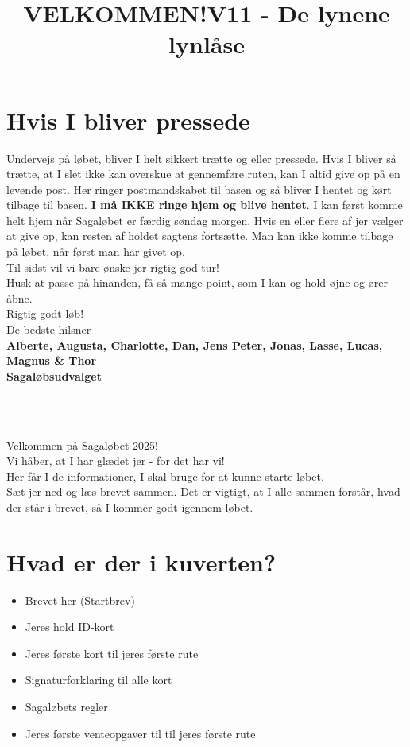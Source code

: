 \section{Hvis I bliver pressede}
Undervejs på løbet, bliver I helt sikkert trætte og eller pressede. Hvis I bliver så trætte, at I slet ikke kan overskue at gennemføre ruten, kan I altid give op på en levende post. Her ringer postmandskabet til basen og så bliver I hentet og kørt tilbage til basen. \textbf{I må IKKE ringe hjem og blive hentet}. I kan først komme helt hjem når Sagaløbet er færdig søndag morgen. Hvis en eller flere af jer vælger at give op, kan resten af holdet sagtens fortsætte. Man kan ikke komme tilbage på løbet, når først man har givet op.\\
\newline
Til sidst vil vi bare ønske jer rigtig god tur!\\
Husk at passe på hinanden, få så mange point, som I kan og hold øjne og ører åbne.\\
\newline
Rigtig godt løb!\\
\newline
\textcolor{søblå}{De bedste hilsner}\\
\textcolor{natblå}{\textbf{Alberte, Augusta, Charlotte, Dan, Jens Peter, Jonas, Lasse, Lucas, Magnus \& Thor}}\\
\textcolor{natblå}{\textbf{Sagaløbsudvalget}}\\
\newpage
\title{VELKOMMEN!}\\
\newline
\title{\textcolor{søblå}{V11 - De lynene lynlåse }}\\
\newline
Velkommen på Sagaløbet 2025!\\
Vi håber, at I har glædet jer - for det har vi!\\
Her får I de informationer, I skal bruge for at kunne starte løbet.\\
Sæt jer ned og læs brevet sammen. Det er vigtigt, at I alle sammen forstår, hvad der står i brevet, så I kommer godt igennem løbet.
\section{Hvad er der i kuverten?}
\begin{itemize}
    \item Brevet her (Startbrev)
    \item Jeres hold ID-kort
    \item Jeres første kort til jeres første rute
    \item Signaturforklaring til alle kort
    \item Sagaløbets regler
    \item Jeres første venteopgaver til til jeres første rute
\end{itemize}
